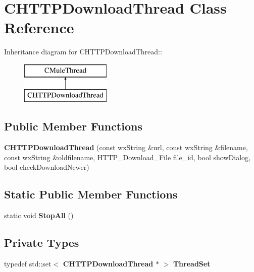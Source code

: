 \section{CHTTPDownloadThread Class Reference}
\label{classCHTTPDownloadThread}
Inheritance diagram for CHTTPDownloadThread::\begin{figure}[H]
\begin{center}
\leavevmode
\includegraphics[height=2cm]{classCHTTPDownloadThread}
\end{center}
\end{figure}
\subsection*{Public Member Functions}
\begin{DoxyCompactItemize}
\item 
{\bf CHTTPDownloadThread} (const wxString \&url, const wxString \&filename, const wxString \&oldfilename, HTTP\_\-Download\_\-File file\_\-id, bool showDialog, bool checkDownloadNewer)
\end{DoxyCompactItemize}
\subsection*{Static Public Member Functions}
\begin{DoxyCompactItemize}
\item 
static void {\bfseries StopAll} ()\label{classCHTTPDownloadThread_a43eb4fe22933ea4820fa43824983fc4a}

\end{DoxyCompactItemize}
\subsection*{Private Types}
\begin{DoxyCompactItemize}
\item 
typedef std::set$<$ {\bf CHTTPDownloadThread} $\ast$ $>$ {\bfseries ThreadSet}\label{classCHTTPDownloadThread_a62912f647770b8e8dbfcc454c1e2e152}

\end{DoxyCompactItemize}
